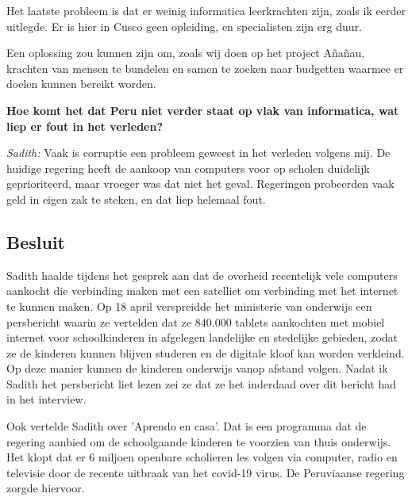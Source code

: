 Het laatste probleem is dat er weinig informatica leerkrachten zijn, zoals ik eerder uitlegde. Er is hier in Cusco geen opleiding, en specialisten zijn erg duur.

Een oplossing zou kunnen zijn om, zoals wij doen op het project Añañau, krachten van mensen te bundelen en samen te zoeken naar budgetten waarmee er doelen kunnen bereikt worden. 

\textbf{Hoe komt het dat Peru niet verder staat op vlak van informatica, wat liep er fout in het verleden?}

\textit{Sadith:} Vaak is corruptie een probleem geweest in het verleden volgens mij. De huidige regering heeft de aankoop van computers voor op scholen duidelijk geprioriteerd, maar vroeger was dat niet het geval. Regeringen probeerden vaak geld in eigen zak te steken, en dat liep helemaal fout. 
 
\subsection{Besluit}
Sadith haalde tijdens het gesprek aan dat de overheid recentelijk vele computers aankocht die verbinding maken met een satelliet om verbinding met het internet te kunnen maken. Op 18 april verspreidde het ministerie van onderwijs een persbericht waarin ze vertelden dat ze 840.000 tablets aankochten met mobiel internet voor schoolkinderen in afgelegen landelijke en stedelijke gebieden, zodat ze de kinderen kunnen blijven studeren en de digitale kloof kan worden verkleind. Op deze manier kunnen de kinderen onderwijs vanop afstand volgen.\autocite{Minedu2020} Nadat ik Sadith het persbericht liet lezen zei ze dat ze het inderdaad over dit bericht had in het interview. 

Ook vertelde Sadith over 'Aprendo en casa'. Dat is een programma dat de regering aanbied om de schoolgaande kinderen te voorzien van thuis onderwijs. Het klopt dat er 6 miljoen openbare scholieren les volgen via computer, radio en televisie door de recente uitbraak van het covid-19 virus. De Peruviaanse regering zorgde hiervoor. \autocite{Minedu2020a}

